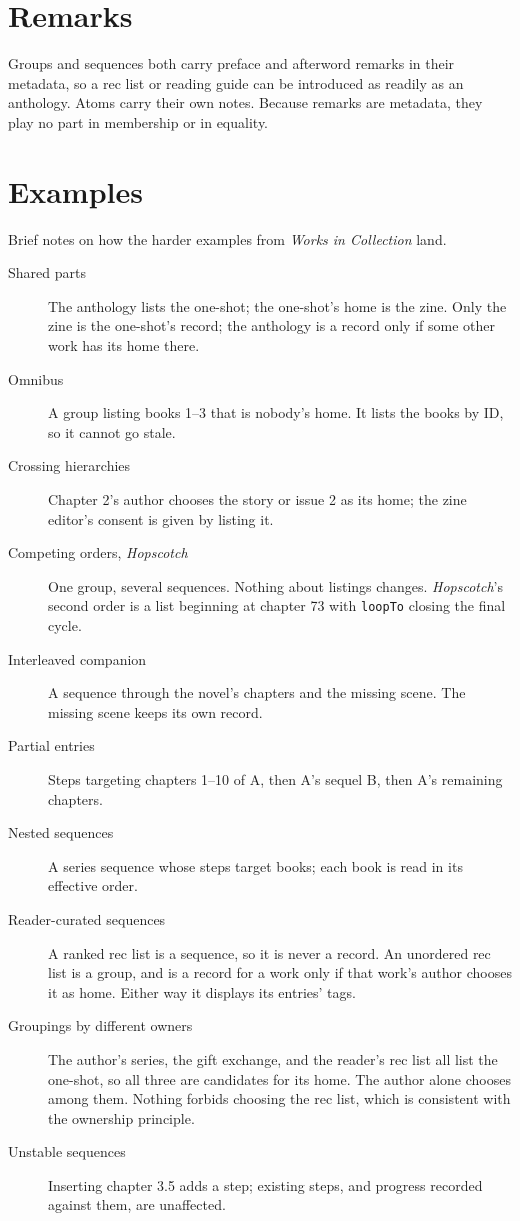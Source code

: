 \documentclass{amsart}
\theoremstyle{remark}
\begin{document}
\section{Remarks}
Groups and sequences both carry preface and afterword remarks in their metadata, so a rec list or reading guide can be introduced as readily as an anthology. Atoms carry their own notes. Because remarks are metadata, they play no part in membership or in equality.

\section{Examples}
Brief notes on how the harder examples from \emph{Works in Collection} land.
\begin{description}
  \item[Shared parts] The anthology lists the one-shot; the one-shot's home is the zine. Only the zine is the one-shot's record; the anthology is a record only if some other work has its home there.
  \item[Omnibus] A group listing books 1--3 that is nobody's home. It lists the books by ID, so it cannot go stale.
  \item[Crossing hierarchies] Chapter 2's author chooses the story or issue 2 as its home; the zine editor's consent is given by listing it.
  \item[Competing orders, \emph{Hopscotch}] One group, several sequences. Nothing about listings changes. \emph{Hopscotch}'s second order is a list beginning at chapter 73 with \lstinline|loopTo| closing the final cycle.
  \item[Interleaved companion] A sequence through the novel's chapters and the missing scene. The missing scene keeps its own record.
  \item[Partial entries] Steps targeting chapters 1--10 of A, then A's sequel B, then A's remaining chapters.
  \item[Nested sequences] A series sequence whose steps target books; each book is read in its effective order.
  \item[Reader-curated sequences] A ranked rec list is a sequence, so it is never a record. An unordered rec list is a group, and is a record for a work only if that work's author chooses it as home. Either way it displays its entries' tags.
  \item[Groupings by different owners] The author's series, the gift exchange, and the reader's rec list all list the one-shot, so all three are candidates for its home. The author alone chooses among them. Nothing forbids choosing the rec list, which is consistent with the ownership principle.
  \item[Unstable sequences] Inserting chapter 3.5 adds a step; existing steps, and progress recorded against them, are unaffected.
\end{description}
\end{document}
